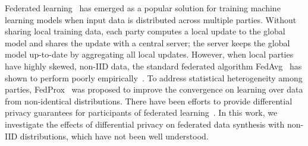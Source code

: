\documentclass[conference]{IEEEtran}
\begin{document}
Federated learning~\cite{FLMcMahan2016} has emerged as a popular solution for training machine learning models when input data is distributed across multiple parties. Without sharing local training data, each party computes a local update to the global model and shares the update with a central server; the server keeps the global model up-to-date by aggregating all local updates. {
However, when local parties have highly skewed, non-IID data, the standard federated algorithm FedAvg~\cite{FLMcMahan2016} has shown to perform poorly empirically~\cite{zhao2018fedNon_IID}. } %
To address statistical heterogeneity among parties, FedProx~\cite{Fedprox2018} was proposed to improve the convergence on learning over data from non-identical distributions.  There have been efforts to provide differential privacy guarantees for participants of federated learning~\cite{DPFedAvg2018}. In this work, we investigate the effects of differential privacy on federated data synthesis with non-IID distributions, which have not been well understood. 


\end{document}

